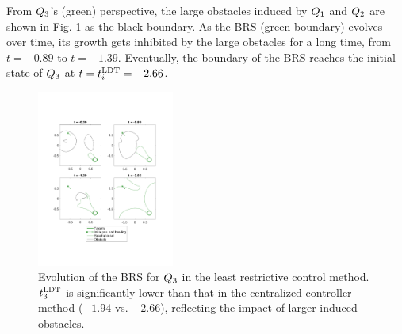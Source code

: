From $Q_3$'s (green) perspective, the large obstacles induced by $Q_1$ and $Q_2$ are shown in Fig. \ref{fig:lrc_rs3} as the black boundary. As the BRS (green boundary) evolves over time, its growth gets inhibited by the large obstacles for a long time, from $t=-0.89$ to $t=-1.39$. Eventually, the boundary of the BRS reaches the initial state of $Q_3$ at $t = t^\text{LDT}_i = -2.66$.

\begin{figure}[h]
  \vspace{-1em}
  \centering
  \includegraphics[width=0.40\textwidth]{"fig/lrc_rs3"}
  \caption{Evolution of the BRS for $Q_3$ in the least restrictive control method. $t^\text{LDT}_3$ is significantly lower than that in the centralized controller method ($-1.94$ vs. $-2.66$), reflecting the impact of larger induced obstacles.}
  \label{fig:lrc_rs3}
  \vspace{-1em}
\end{figure}